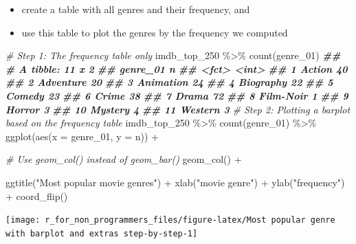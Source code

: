 \documentclass[
]{book}
\newenvironment{Shaded}{\begin{snugshade}}{\end{snugshade}}
\newcommand{\AttributeTok}[1]{\textcolor[rgb]{0.77,0.63,0.00}{#1}}
\newcommand{\CommentTok}[1]{\textcolor[rgb]{0.56,0.35,0.01}{\textit{#1}}}
\newcommand{\DocumentationTok}[1]{\textcolor[rgb]{0.56,0.35,0.01}{\textbf{\textit{#1}}}}
\newcommand{\FunctionTok}[1]{\textcolor[rgb]{0.00,0.00,0.00}{#1}}
\newcommand{\NormalTok}[1]{#1}
\newcommand{\SpecialCharTok}[1]{\textcolor[rgb]{0.00,0.00,0.00}{#1}}
\newcommand{\StringTok}[1]{\textcolor[rgb]{0.31,0.60,0.02}{#1}}
\begin{document}
\begin{itemize}
\item
  create a table with all genres and their frequency, and
\item
  use this table to plot the genres by the frequency we computed
\end{itemize}

\begin{Shaded}
\begin{Highlighting}[]
\CommentTok{\# Step 1: The frequency table only}
\NormalTok{imdb\_top\_250 }\SpecialCharTok{\%\textgreater{}\%}
  \FunctionTok{count}\NormalTok{(genre\_01)}
\DocumentationTok{\#\# \# A tibble: 11 x 2}
\DocumentationTok{\#\#    genre\_01      n}
\DocumentationTok{\#\#    \textless{}fct\textgreater{}     \textless{}int\textgreater{}}
\DocumentationTok{\#\#  1 Action       40}
\DocumentationTok{\#\#  2 Adventure    20}
\DocumentationTok{\#\#  3 Animation    24}
\DocumentationTok{\#\#  4 Biography    22}
\DocumentationTok{\#\#  5 Comedy       23}
\DocumentationTok{\#\#  6 Crime        38}
\DocumentationTok{\#\#  7 Drama        72}
\DocumentationTok{\#\#  8 Film{-}Noir     1}
\DocumentationTok{\#\#  9 Horror        3}
\DocumentationTok{\#\# 10 Mystery       4}
\DocumentationTok{\#\# 11 Western       3}
\CommentTok{\# Step 2: Plotting a barplot based on the frequency table}
\NormalTok{imdb\_top\_250 }\SpecialCharTok{\%\textgreater{}\%}
  \FunctionTok{count}\NormalTok{(genre\_01) }\SpecialCharTok{\%\textgreater{}\%}
  \FunctionTok{ggplot}\NormalTok{(}\FunctionTok{aes}\NormalTok{(}\AttributeTok{x =}\NormalTok{ genre\_01, }\AttributeTok{y =}\NormalTok{ n)) }\SpecialCharTok{+}

  \CommentTok{\# Use geom\_col() instead of geom\_bar()}
  \FunctionTok{geom\_col}\NormalTok{() }\SpecialCharTok{+}

  \FunctionTok{ggtitle}\NormalTok{(}\StringTok{"Most popular movie genres"}\NormalTok{) }\SpecialCharTok{+}
  \FunctionTok{xlab}\NormalTok{(}\StringTok{"movie genre"}\NormalTok{) }\SpecialCharTok{+}
  \FunctionTok{ylab}\NormalTok{(}\StringTok{"frequency"}\NormalTok{) }\SpecialCharTok{+}
  \FunctionTok{coord\_flip}\NormalTok{()}
\end{Highlighting}
\end{Shaded}

\begin{center}\texttt{[image: r\_for\_non\_programmers\_files/figure-latex/Most popular genre with barplot and extras step-by-step-1]} \end{center}
\end{document}
